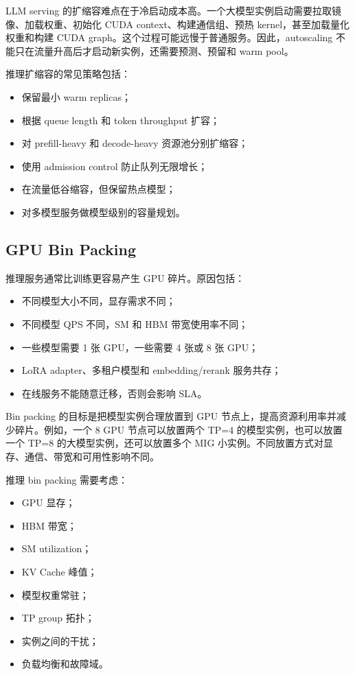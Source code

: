 LLM serving 的扩缩容难点在于冷启动成本高。一个大模型实例启动需要拉取镜像、加载权重、初始化 CUDA context、构建通信组、预热 kernel，甚至加载量化权重和构建 CUDA graph。这个过程可能远慢于普通服务。因此，autoscaling 不能只在流量升高后才启动新实例，还需要预测、预留和 warm pool。

推理扩缩容的常见策略包括：

\begin{itemize}
  \item 保留最小 warm replicas；
  \item 根据 queue length 和 token throughput 扩容；
  \item 对 prefill-heavy 和 decode-heavy 资源池分别扩缩容；
  \item 使用 admission control 防止队列无限增长；
  \item 在流量低谷缩容，但保留热点模型；
  \item 对多模型服务做模型级别的容量规划。
\end{itemize}

\subsection{GPU Bin Packing}
\label{subsec:gpu-bin-packing}

推理服务通常比训练更容易产生 GPU 碎片。原因包括：

\begin{itemize}
  \item 不同模型大小不同，显存需求不同；
  \item 不同模型 QPS 不同，SM 和 HBM 带宽使用率不同；
  \item 一些模型需要 1 张 GPU，一些需要 4 张或 8 张 GPU；
  \item LoRA adapter、多租户模型和 embedding/rerank 服务共存；
  \item 在线服务不能随意迁移，否则会影响 SLA。
\end{itemize}

Bin packing 的目标是把模型实例合理放置到 GPU 节点上，提高资源利用率并减少碎片。例如，一个 8 GPU 节点可以放置两个 TP=4 的模型实例，也可以放置一个 TP=8 的大模型实例，还可以放置多个 MIG 小实例。不同放置方式对显存、通信、带宽和可用性影响不同。

推理 bin packing 需要考虑：

\begin{itemize}
  \item GPU 显存；
  \item HBM 带宽；
  \item SM utilization；
  \item KV Cache 峰值；
  \item 模型权重常驻；
  \item TP group 拓扑；
  \item 实例之间的干扰；
  \item 负载均衡和故障域。
\end{itemize}

